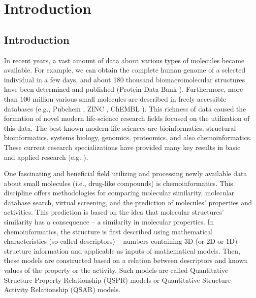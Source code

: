 \part{Introduction}

\chapter{Introduction}

In recent years, a vast amount of data about various types of molecules became
available. For example, we can obtain the complete human genome of a selected
individual in a few days, and about 180 thousand biomacromolecular structures
have been determined and published (Protein Data Bank \cite{Berman2014}).
Furthermore, more
than 100 million various small molecules are described in freely accessible
databases (e.g., Pubchem \cite{pubchem}, ZINC \cite{Irwin2012},
ChEMBL \cite{Bento2013}). This richness of data caused
the formation of novel modern life-science research fields focused on the
utilization of this data. The best-known modern life sciences are
bioinformatics, structural bioinformatics, systems biology, genomics,
proteomics, and also chemoinformatics. These current research specializations
have provided many key results in basic and applied research (e.g.
\cite{Paulsen2015, Cao2013, Prota2013, Lu2005, Puente2011, Nayal2006, Xie2009}
).

One fascinating and beneficial field utilizing and processing newly available
data about small molecules (i.e., drug-like compounds) is chemoinformatics.
This discipline offers me\-tho\-do\-lo\-gies for comparing molecular similarity,
molecular database search, virtual screening, and the prediction of molecules'
properties and activities. This prediction is based on the idea that molecular
structures' similarity has a consequence -- a similarity in molecular
properties. In chemoinformatics, the structure is first described using
mathematical characteristics (so-called descriptors) -- numbers containing 3D
(or 2D or 1D) structure information and applicable as inputs of mathematical
models. Then, these models are constructed based on a relation between
descriptors and known values of the property or the activity. Such models are
called Quantitative Stru\-cture-Property Relationship (QSPR) models or
Quantitative Structure-Activity Relationship (QSAR) models.

